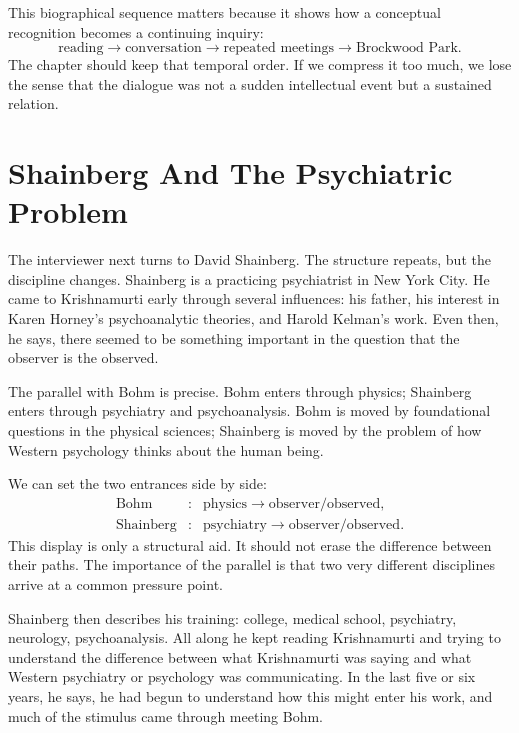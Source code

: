 This biographical sequence matters because it shows how a conceptual recognition becomes a continuing inquiry:
\begin{equation}
\text{reading}
\longrightarrow
\text{conversation}
\longrightarrow
\text{repeated meetings}
\longrightarrow
\text{Brockwood Park}.
\end{equation}
The chapter should keep that temporal order. If we compress it too much, we lose the sense that the dialogue was not a sudden intellectual event but a sustained relation.

\section{Shainberg And The Psychiatric Problem}

The interviewer next turns to David Shainberg. The structure repeats, but the discipline changes. Shainberg is a practicing psychiatrist in New York City. He came to Krishnamurti early through several influences: his father, his interest in Karen Horney's psychoanalytic theories, and Harold Kelman's work. Even then, he says, there seemed to be something important in the question that the observer is the observed.

The parallel with Bohm is precise. Bohm enters through physics; Shainberg enters through psychiatry and psychoanalysis. Bohm is moved by foundational questions in the physical sciences; Shainberg is moved by the problem of how Western psychology thinks about the human being.

We can set the two entrances side by side:
\begin{equation}
\begin{array}{ccl}
\text{Bohm} &:& \text{physics} \longrightarrow \text{observer/observed},\\
\text{Shainberg} &:& \text{psychiatry} \longrightarrow \text{observer/observed}.
\end{array}
\end{equation}
This display is only a structural aid. It should not erase the difference between their paths. The importance of the parallel is that two very different disciplines arrive at a common pressure point.

Shainberg then describes his training: college, medical school, psychiatry, neurology, psychoanalysis. All along he kept reading Krishnamurti and trying to understand the difference between what Krishnamurti was saying and what Western psychiatry or psychology was communicating. In the last five or six years, he says, he had begun to understand how this might enter his work, and much of the stimulus came through meeting Bohm.

